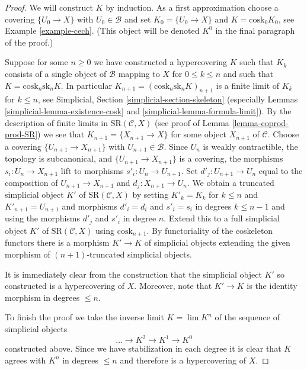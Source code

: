 \begin{proof}
We will construct $K$ by induction. As a first approximation choose
a covering $\{U_0 \to X\}$ with $U_0 \in \mathcal{B}$ and set
$K_0 = \{U_0 \to X\}$ and $K = \text{cosk}_0 K_0$, see
Example \ref{example-cech}. (This object will be denoted $K^0$ in
the final paragraph of the proof.)

\medskip\noindent
Suppose for some $n \geq 0$ we have constructed a hypercovering $K$
such that $K_k$ consists of a single object of $\mathcal{B}$
mapping to $X$ for $0 \leq k \leq n$ and such that
$K = \text{cosk}_n \text{sk}_n K$. In particular
$K_{n + 1} = (\text{cosk}_n \text{sk}_n K)_{n + 1}$ is a finite
limit of $K_k$ for $k \leq n$, see
Simplicial, Section \ref{simplicial-section-skeleton}
(especially Lemmas \ref{simplicial-lemma-existence-cosk} and
\ref{simplicial-lemma-formula-limit}).
By the description of finite limits
in $\text{SR}(\mathcal{C}, X)$ (see proof of
Lemma \ref{lemma-coprod-prod-SR})
we see that $K_{n + 1} = \{X_{n + 1} \to X\}$ for some object $X_{n + 1}$
of $\mathcal{C}$. Choose a covering $\{U_{n + 1} \to X_{n + 1}\}$
with $U_{n + 1} \in \mathcal{B}$. Since $U_n$ is weakly contractible,
the topology is subcanonical, and $\{U_{n + 1} \to X_{n + 1}\}$
is a covering, the morphisms $s_i : U_n \to X_{n + 1}$ lift to morphisms
$s'_i : U_n \to U_{n + 1}$. Set $d'_j : U_{n + 1} \to U_n$
equal to the composition of $U_{n + 1} \to X_{n + 1}$ and
$d_j : X_{n + 1} \to U_n$.
We obtain a truncated simplicial object $K'$ of $\text{SR}(\mathcal{C}, X)$
by setting $K'_k = K_k$ for $k \leq n$ and $K'_{n + 1} = U_{n + 1}$
and morphisms $d'_i = d_i$ and $s'_i = s_i$ in degrees $k \leq n - 1$
and using the morphisms $d'_j$ and $s'_i$ in degree $n$.
Extend this to a full simplicial object $K'$ of
$\text{SR}(\mathcal{C}, X)$ using $\text{cosk}_{n + 1}$. By
functoriality of the coskeleton functors there is a morphism
$K' \to K$ of simplicial objects extending the
given morphism of $(n + 1)$-truncated simplicial objects.

\medskip\noindent
It is immediately clear from the construction that the simplicial object $K'$
so constructed is a hypercovering of $X$. Moreover, note that $K' \to K$
is the identity morphism in degrees $\leq n$.

\medskip\noindent
To finish the proof we take the inverse limit $K = \lim K^n$
of the sequence of simplicial objects
$$
\ldots \to K^2 \to K^1 \to K^0
$$
constructed above. Since we have stabilization in each degree it is
clear that $K$ agrees with $K^n$ in degrees $\leq n$ and therefore
is a hypercovering of $X$.
\end{proof}














